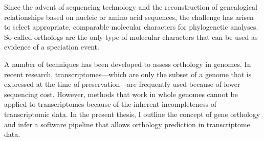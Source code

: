 Since the advent of  sequencing
technology and the reconstruction of genealogical relationships based on nucleic
or amino acid sequences, the challenge has arisen to select appropriate,
comparable molecular characters for phylogenetic analyses. So-called orthologs
are the only type of molecular characters that can be used as evidence of a
speciation event. 

A number of techniques has been developed to assess orthology in genomes. In
recent research, transcriptomes---which are only the subset of a genome that is
expressed at the time of  preservation---are
frequently used because of lower sequencing cost. However, methods that work in
whole genomes cannot be applied to transcriptomes because of the inherent
incompleteness of transcriptomic data.  In the present thesis, I outline the
concept of gene orthology and infer a software pipeline that allows orthology
prediction in transcriptome data.

